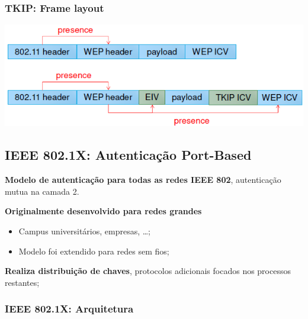 \documentclass{article}
\begin{document}
\subsubsection*{TKIP: Frame layout}

\begin{center}
  \includegraphics[scale=0.6]{47}
\end{center}

\subsection{IEEE 802.1X: Autenticação Port-Based}

\begin{flushleft}
  \textbf{Modelo de autenticação para todas as redes IEEE 802},
  autenticação mutua na camada 2.

  \vspace{2mm}

  \textbf{Originalmente desenvolvido para redes grandes}
  \begin{itemize}
    \item Campus universitários, empresas, \dots;
    \item Modelo foi extendido para redes sem fios;
  \end{itemize}

  \textbf{Realiza distribuição de chaves}, protocolos adicionais
  focados nos processos restantes;
\end{flushleft}

\pagebreak

\subsubsection{IEEE 802.1X: Arquitetura}
\end{document}
